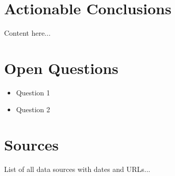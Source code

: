 \documentclass{wilson-report}
\begin{document}
\section{Actionable Conclusions}
Content here...


\section*{Open Questions}
\small
\begin{itemize}[leftmargin=1.2em, itemsep=4pt]
  \item Question 1
  \item Question 2
\end{itemize}

\section*{Sources}
\small
List of all data sources with dates and URLs...

\signoff
\end{document}
